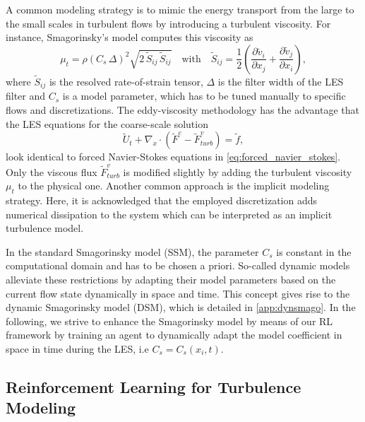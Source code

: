 A common modeling strategy is to mimic the energy transport from the large to the small scales in turbulent flows by introducing a turbulent viscosity.
For instance, Smagorinsky's model \cite{smagorinsky1963general} computes this viscosity as 
\begin{equation}
  \mu_t = \rho\left(C_s\,\Delta\right)^2 \sqrt{2\,\tilde{S}_{ij}\,\tilde{S}_{ij}} \quad \text{with}\quad \tilde{S}_{ij}=\frac{1}{2}\left(\frac{\partial \tilde{v}_i}{\partial x_j}+\frac{\partial \tilde{v}_j}{\partial x_i}\right),
  \label{eq:smago}
\end{equation}
where $\tilde{S}_{ij}$ is the resolved rate-of-strain tensor, $\Delta$ is the filter width of the LES filter and $C_s$ is a model parameter, which has to be tuned manually to specific flows and discretizations.
The eddy-viscosity methodology has the advantage that the LES equations for the coarse-scale solution 
\begin{equation}
  \tilde{U}_t + \nabla_x\cdot \left(\tilde{F}^c - \tilde{F}^v_{turb}\right) = \tilde{f},
  \label{eq:les_equation}
\end{equation}
look identical to forced Navier-Stokes equations in \eqref{eq:forced_navier_stokes}.
Only the viscous flux $\tilde{F}^v_{turb}$ is modified slightly by adding the turbulent viscosity $\mu_t$ to the physical one.
Another common approach is the implicit modeling strategy.
Here, it is acknowledged that the employed discretization adds numerical dissipation to the system which can be interpreted as an implicit turbulence model.

In the standard Smagorinsky model (SSM), the parameter $C_s$ is constant in the computational domain and has to be chosen a priori.
So-called dynamic models alleviate these restrictions by adapting their model parameters based on the current flow state dynamically in space and time.
This concept gives rise to the dynamic Smagorinsky model (DSM), which is detailed in \ref{app:dynsmago}.
In the following, we strive to enhance the Smagorinsky model by means of our RL framework by training an agent to dynamically adapt the model coefficient in space in time during the LES, i.e $C_s=C_s(x_i,t)$.




\subsection{Reinforcement Learning for Turbulence Modeling}



